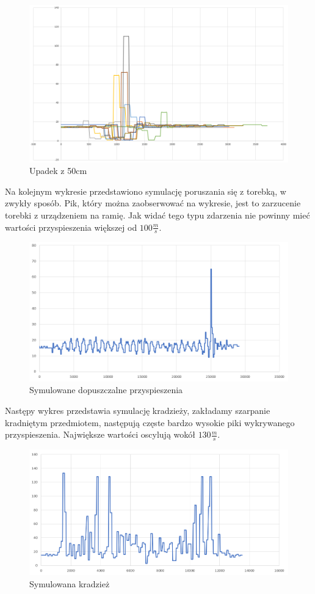 \documentclass[10pt, a4paper]{article}
\begin{document}
\begin{figure}[H]
\centering
\includegraphics[width=13cm]{figures/t1.png}
\caption{Upadek z 50cm}
\end{figure}

Na kolejnym wykresie przedstawiono symulację poruszania się z torebką, w zwykły sposób. Pik, który można zaobserwować na wykresie, jest to zarzucenie torebki z urządzeniem na ramię. Jak widać tego typu zdarzenia nie powinny mieć wartości przyspieszenia większej od $100 \frac{m}{s}$. 
\begin{figure}[H]
\centering
\includegraphics[width=13cm]{figures/t2.png}
\caption{Symulowane dopuszczalne przyspieszenia}
\end{figure}
Następy wykres przedstawia symulację kradzieży, zakładamy szarpanie kradniętym przedmiotem, następują częste bardzo wysokie piki wykrywanego przyspieszenia. Największe wartości oscylują wokół $130\frac{m}{s}$.  \begin{figure}[H]
\centering
\includegraphics[width=13cm]{figures/t3.png}
\caption{Symulowana kradzież}
\end{figure}
\end{document}
